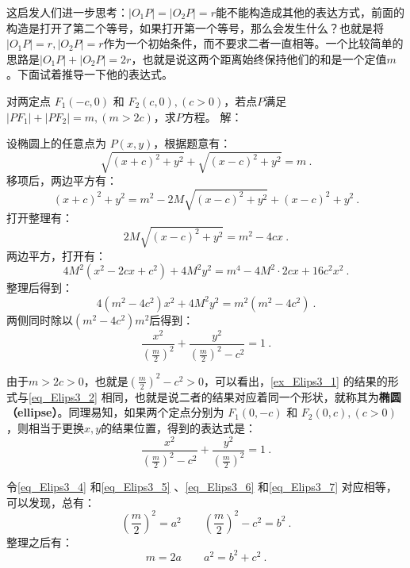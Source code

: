 这启发人们进一步思考：$|O_1P|=|O_2P|=r$能不能构造成其他的表达方式，前面的构造是打开了第二个等号，如果打开第一个等号，那么会发生什么？也就是将$|O_1P|=r,|O_2P|=r$作为一个初始条件，而不要求二者一直相等。一个比较简单的思路是$|O_1P|+|O_2P|=2r$，也就是说这两个距离始终保持他们的和是一个定值$m$。下面试着推导一下他的表达式。

\begin{example}{对两定点 $F_1(-c, 0)$ 和 $F_2(c, 0),(c>0)$，若点$P$满足$|PF_1| + |PF_2| = m,(m > 2c)$，求$P$方程。}\label{ex_Elips3_1}
解：

设椭圆上的任意点为 $P(x, y)$，根据题意有：
\begin{equation}
\sqrt{(x + c)^2 + y^2} + \sqrt{(x - c)^2 + y^2} = m~.
\end{equation}
移项后，两边平方有：
\begin{equation}
(x + c)^2 + y^2 = m^2 - 2M\sqrt{(x - c)^2 + y^2} + (x - c)^2 + y^2~.
\end{equation}
打开整理有：
\begin{equation}
2M\sqrt{(x - c)^2 + y^2}= m^2 - 4cx~.
\end{equation}
两边平方，打开有：
\begin{equation}
4M^2(x^2 - 2cx+c^2) + 4M^2y^2= m^4-4M^2\cdot2cx+16c^2x^2~.
\end{equation}
整理后得到：
\begin{equation}
4(m^2 -4c^2)x^2 + 4M^2y^2= m^2(m^2-4c^2)~.
\end{equation}
两侧同时除以$(m^2-4c^2)m^2$后得到：
\begin{equation}\label{eq_Elips3_4}
\frac{x^2}{\left(\displaystyle\frac{m}{2}\right)^2} + \frac{y^2}{\displaystyle\left(\frac{m}{2}\right)^2-c^2}=1~.
\end{equation}
\end{example}

由于$m>2c>0$，也就是$\displaystyle\left(\frac{m}{2}\right)^2-c^2>0$，可以看出，\autoref{ex_Elips3_1} 的结果的形式与\autoref{eq_Elips3_2} 相同，也就是说二者的结果对应着同一个形状，就称其为\textbf{椭圆（ellipse）}。同理易知，如果两个定点分别为 $F_1(0,-c)$ 和 $F_2(0,c),(c>0)$，则相当于更换$x,y$的结果位置，得到的表达式是：
\begin{equation}\label{eq_Elips3_6}
\frac{x^2}{\displaystyle\left(\frac{m}{2}\right)^2-c^2}+\frac{y^2}{\left(\displaystyle\frac{m}{2}\right)^2} =1~.
\end{equation}

令\autoref{eq_Elips3_4} 和\autoref{eq_Elips3_5} 、\autoref{eq_Elips3_6} 和\autoref{eq_Elips3_7} 对应相等，可以发现，总有：
\begin{equation}
\left(\frac{m}{2}\right)^2=a^2\qquad
\left(\frac{m}{2}\right)^2-c^2=b^2~.
\end{equation}
整理之后有：
\begin{equation}\label{eq_Elips3_8}
m=2a\qquad
a^2=b^2+c^2~.
\end{equation}

